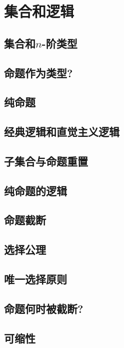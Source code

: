 \chapter{集合和逻辑}
\label{cha:logic}


\section{集合和\texorpdfstring{$n$}{n}-阶类型}
\label{sec:basics-sets}


\section{命题作为类型?}
\label{subsec:pat?}


\section{纯命题}
\label{subsec:hprops}


\section{经典逻辑和直觉主义逻辑}
\label{sec:intuitionism}


\section{子集合与命题重置}
\label{subsec:prop-subsets}


\section{纯命题的逻辑}
\label{subsec:logic-hprop}


\section{命题截断}
\label{subsec:prop-trunc}


\section{选择公理}
\label{sec:axiom-choice}


\section{唯一选择原则}
\label{sec:unique-choice}


\section{命题何时被截断?}
\label{subsec:when-trunc}


\section{可缩性}
\label{sec:contractibility}


\sectionNotes


\sectionExercises

